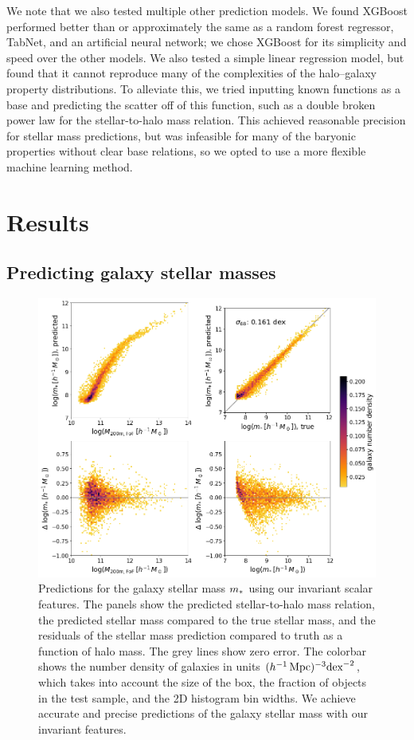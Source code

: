 We note that we also tested multiple other prediction models. 
We found XGBoost performed better than or approximately the same as a random forest regressor, TabNet, and an artificial neural network; we chose XGBoost for its simplicity and speed over the other models.
We also tested a simple linear regression model, but found that it cannot reproduce many of the complexities of the halo--galaxy property distributions.
To alleviate this, we tried inputting known functions as a base and predicting the scatter off of this function, such as a double broken power law for the stellar-to-halo mass relation.
This achieved reasonable precision for stellar mass predictions, but was infeasible for many of the baryonic properties without clear base relations, so we opted to use a more flexible machine learning method.


\section{Results}
\label{sec:results}

\subsection{Predicting galaxy stellar masses}
\label{sec:pred_mstellar}

\begin{figure}
    \centering
    \includegraphics[width=0.7\columnwidth]{pred_mstellar.png}
    \caption{Predictions for the galaxy stellar mass $m_*$ using our invariant scalar features. The panels show the predicted stellar-to-halo mass relation, the predicted stellar mass compared to the true stellar mass, and the residuals of the stellar mass prediction compared to truth as a function of halo mass. The grey lines show zero error. The colorbar shows the number density of galaxies in units $(h^{-1}\,\mathrm{Mpc})^{-3} \text{dex}^{-2}$, which takes into account the size of the box, the fraction of objects in the test sample, and the 2D histogram bin widths. We achieve accurate and precise predictions of the galaxy stellar mass with our invariant features.}
    \label{fig:mstellar}
\end{figure}

